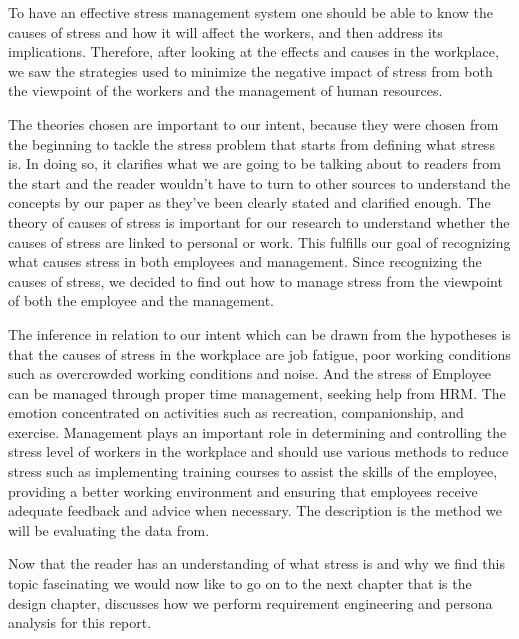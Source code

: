To have an effective stress management system one should be able to know the causes of stress and how it will affect the workers, and then address its implications.  Therefore, after looking at the effects and causes in the workplace, we saw the strategies used to minimize the negative impact of stress from both the viewpoint of the workers and the management of human resources.

The theories chosen are important to our intent, because they were chosen from the beginning to tackle the stress problem that starts from defining what stress is. In doing so, it clarifies what we are going to be talking about to readers from the start and the reader wouldn't have to turn to other sources to understand the concepts by our paper as they've been clearly stated and clarified enough.  The theory of causes of stress is important for our research to understand whether the causes of stress are linked to personal or work. This fulfills our goal of recognizing what causes stress in both employees and management. Since recognizing the causes of stress, we decided to find out how to manage stress from the viewpoint of both the employee and the management.

The inference in relation to our intent which can be drawn from the hypotheses is that the causes of stress in the workplace are job fatigue, poor working conditions such as overcrowded working conditions and noise.  And the stress of Employee can be managed through proper time management, seeking help from \acs{HRM}. The emotion concentrated on activities such as recreation, companionship, and exercise. Management plays an important role in determining and controlling the stress level of workers in the workplace and should use various methods to reduce stress such as implementing training courses to assist the skills of the employee, providing a better working environment and ensuring that employees receive adequate feedback and advice when necessary. The description is the method we will be evaluating the data from.

Now that the reader has an understanding of what stress is and why we find this topic fascinating we would now like to go on to the next chapter that is the design chapter, discusses how we perform requirement engineering and persona analysis for this report.